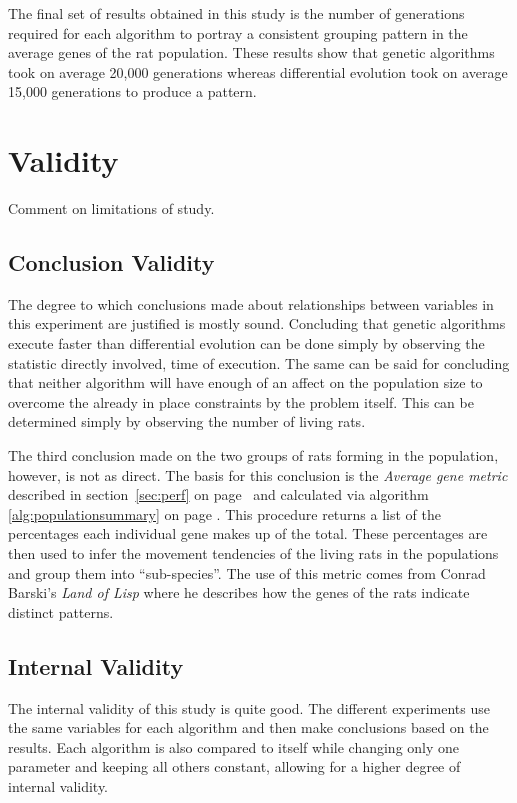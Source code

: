 \documentclass{sig-alternate}
\begin{document}
The final set of results obtained in this study is the number of generations required for each algorithm to portray a consistent grouping pattern in the average genes of the rat population.  These results show that genetic algorithms took on average 20,000 generations whereas differential evolution took on average 15,000 generations to produce a pattern.  

\section{Validity}
Comment on limitations of study.
\subsection{Conclusion Validity}
The degree to which conclusions made about relationships between variables in this experiment are justified is mostly sound.  Concluding that genetic algorithms execute faster than differential evolution can be done simply by observing the statistic directly involved, time of execution.  The same can be said for concluding that neither algorithm will have enough of an affect on the population size to overcome the already in place constraints by the problem itself.  This can be determined simply by observing the number of living rats.

The third conclusion made on the two groups of rats forming in the population, however, is not as direct.  The basis for this conclusion is the \emph{Average gene metric} described in section~\ref{sec:perf} on page~\pageref{sec:perf} and calculated via algorithm \ref{alg:populationsummary} on page \pageref{alg:populationsummary}.  This procedure returns a list of the percentages each individual gene makes up of the total.  These percentages are then used to infer the movement tendencies of the living rats in the populations and group them into ``sub-species''.  The use of this metric comes from Conrad Barski's \emph{Land of Lisp} where he describes how the genes of the rats indicate distinct patterns.\cite{LOL}

\subsection{Internal Validity}
The internal validity of this study is quite good.  The different experiments use the same variables for each algorithm and then make conclusions based on the results.  Each algorithm is also compared to itself while changing only one parameter and keeping all others constant, allowing for a higher degree of internal validity.
\end{document}
